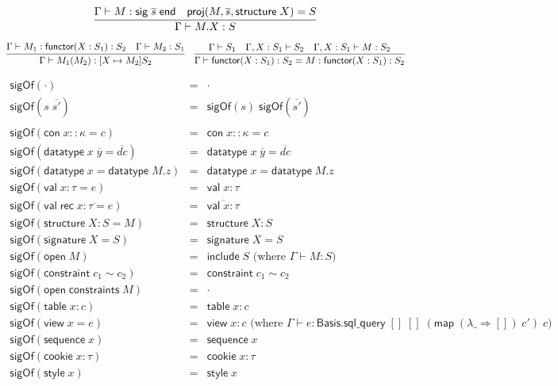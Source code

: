 \documentclass{article}
\newcommand{\mt}[1]{\mathsf{#1}}
\begin{document}
$$\infer{\Gamma \vdash M.X : S}{
  \Gamma \vdash M : \mt{sig} \; \overline{s} \; \mt{end}
  & \mt{proj}(M, \overline{s}, \mt{structure} \; X) = S
}$$

$$\infer{\Gamma \vdash M_1(M_2) : [X \mapsto M_2]S_2}{
  \Gamma \vdash M_1 : \mt{functor}(X : S_1) : S_2
  & \Gamma \vdash M_2 : S_1
}
\quad \infer{\Gamma \vdash \mt{functor} (X : S_1) : S_2 = M : \mt{functor} (X : S_1) : S_2}{
  \Gamma \vdash S_1
  & \Gamma, X : S_1 \vdash S_2
  & \Gamma, X : S_1 \vdash M : S_2
}$$

\begin{eqnarray*}
  \mt{sigOf}(\cdot) &=& \cdot \\
  \mt{sigOf}(s \; \overline{s'}) &=& \mt{sigOf}(s) \; \mt{sigOf}(\overline{s'}) \\
  \\
  \mt{sigOf}(\mt{con} \; x :: \kappa = c) &=& \mt{con} \; x :: \kappa = c \\
  \mt{sigOf}(\mt{datatype} \; x \; \overline{y} = \overline{dc}) &=& \mt{datatype} \; x \; \overline{y} = \overline{dc} \\
  \mt{sigOf}(\mt{datatype} \; x = \mt{datatype} \; M.z) &=& \mt{datatype} \; x = \mt{datatype} \; M.z \\
  \mt{sigOf}(\mt{val} \; x : \tau = e) &=& \mt{val} \; x : \tau \\
  \mt{sigOf}(\mt{val} \; \mt{rec} \; \overline{x : \tau = e}) &=& \overline{\mt{val} \; x : \tau} \\
  \mt{sigOf}(\mt{structure} \; X : S = M) &=& \mt{structure} \; X : S \\
  \mt{sigOf}(\mt{signature} \; X = S) &=& \mt{signature} \; X = S \\
  \mt{sigOf}(\mt{open} \; M) &=& \mt{include} \; S \textrm{ (where $\Gamma \vdash M : S$)} \\
  \mt{sigOf}(\mt{constraint} \; c_1 \sim c_2) &=& \mt{constraint} \; c_1 \sim c_2 \\
  \mt{sigOf}(\mt{open} \; \mt{constraints} \; M) &=& \cdot \\
  \mt{sigOf}(\mt{table} \; x : c) &=& \mt{table} \; x : c \\
  \mt{sigOf}(\mt{view} \; x = e) &=& \mt{view} \; x : c \textrm{ (where $\Gamma \vdash e : \mt{Basis}.\mt{sql\_query} \; [] \; [] \; (\mt{map} \; (\lambda \_ \Rightarrow []) \; c') \; c$)} \\
  \mt{sigOf}(\mt{sequence} \; x) &=& \mt{sequence} \; x \\
  \mt{sigOf}(\mt{cookie} \; x : \tau) &=& \mt{cookie} \; x : \tau \\
  \mt{sigOf}(\mt{style} \; x) &=& \mt{style} \; x
\end{eqnarray*}
\end{document}
